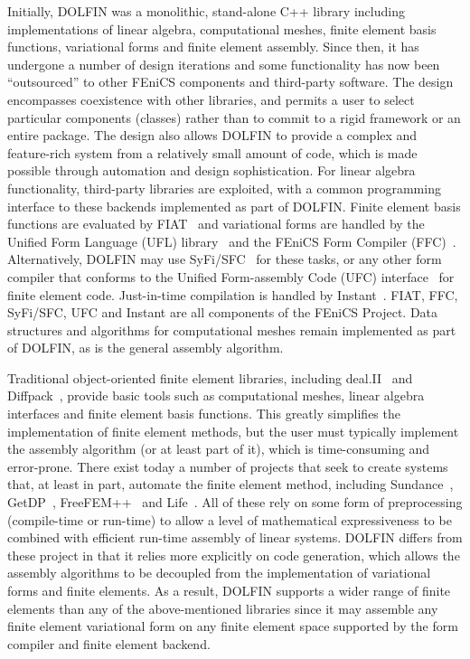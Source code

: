 \documentclass[acmtoms]{acmtrans2m}
\newcommand{\dolfin}{DOLFIN}
\newcommand{\fenics}{FEniCS}
\begin{document}
Initially, \dolfin{} was a monolithic, stand-alone C++ library
including implementations of linear algebra, computational meshes,
finite element basis functions, variational forms and finite element
assembly. Since then, it has undergone a number of design
iterations and some functionality has now been ``outsourced'' to other
\fenics{} components and third-party software. The design encompasses
coexistence with other libraries, and permits a user to select
particular components (classes) rather than to commit to a rigid
framework or an entire package. The design also allows \dolfin{} to
provide a complex and feature-rich system from a relatively small
amount of code, which is made possible through
automation and design sophistication.
For linear algebra functionality, third-party libraries are exploited,
with a common programming interface to these backends implemented as
part of \dolfin{}. Finite element basis functions are evaluated by
FIAT~\cite{www:FIAT,Kir04} and variational forms are handled by
the Unified Form Language (UFL) library~\cite{www:UFL,Alnaes2009}
and the
\fenics{} Form Compiler (FFC)~\cite{www:ffc,kirby:2006}.
Alternatively,
\dolfin{} may use SyFi/SFC~\cite{www:SyFi,alnaes:2009} for
these tasks, or any
other form compiler that conforms to the Unified Form-assembly Code
(UFC) interface~\cite{www:UFC} for finite element code.  Just-in-time
compilation is handled by Instant~\cite{www:Instant}.
FIAT, FFC, SyFi/SFC, UFC and Instant
are all components of the \fenics{} Project.
Data structures and algorithms for computational meshes remain
implemented as part of \dolfin{}, as is the general assembly
algorithm.

Traditional object-oriented finite element libraries, including
deal.II~\cite{bangerth:2007} and Diffpack~\cite{langtangen:book},
provide basic tools such as computational meshes, linear algebra
interfaces and finite element basis functions.  This greatly
simplifies the implementation of finite element methods, but the user
must typically implement the assembly algorithm (or at least part of it),
which
is time-consuming and error-prone. There exist today
a number of projects that seek to create systems that, at least in part,
automate the finite element method, including
Sundance~\cite{sundance:www}, GetDP~\cite{getdp:www},
FreeFEM++~\cite{freefem:www}
and Life~\cite{life:www,prudhomme2008}.
All of these rely on some form of
preprocessing (compile-time or run-time) to allow a level of
mathematical expressiveness to be combined with efficient run-time
assembly of linear systems. \dolfin{} differs from these project in
that it relies more explicitly on code generation, which allows the
assembly algorithms to be decoupled from the implementation of
variational forms and finite elements. As a result, \dolfin{} supports
a wider range of finite elements than any of the above-mentioned
libraries since it may assemble any finite element variational form on
any finite element space supported by the form compiler and finite
element backend.
\end{document}
